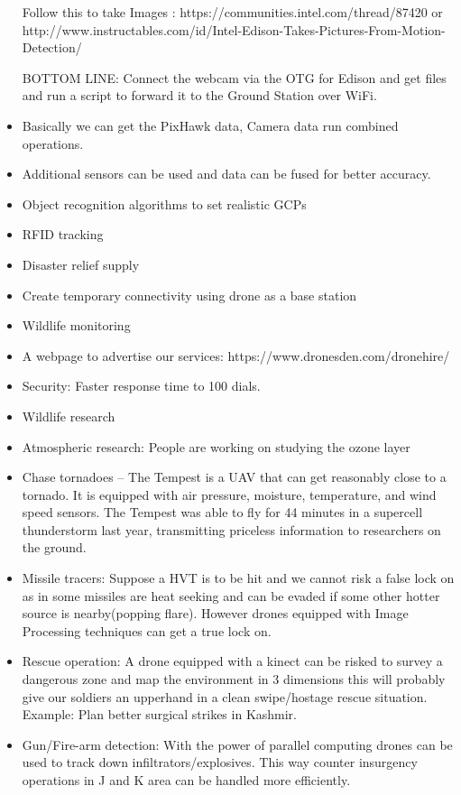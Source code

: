 \documentclass[12pt]{report}
\begin{document}
\begin{itemize}
Follow this to take Images : https://communities.intel.com/thread/87420 or http://www.instructables.com/id/Intel-Edison-Takes-Pictures-From-Motion-Detection/


BOTTOM LINE: Connect the webcam via the OTG for Edison and get files and run a script to forward it to the Ground Station over WiFi.


\item Basically we can get the PixHawk data, Camera data run combined operations.
\item Additional sensors can be used and data can be fused for better accuracy.
\item Object recognition algorithms to set realistic GCPs
\item RFID tracking
\item Disaster relief supply
\item Create temporary connectivity using drone as a base station
\item Wildlife monitoring
\item A webpage to advertise our services: https://www.dronesden.com/dronehire/
\item Security: Faster response time to 100 dials.
\item Wildlife research
\item Atmospheric research: People are working on studying the ozone layer
\item Chase tornadoes – The Tempest is a UAV that can get reasonably close to a tornado. It is equipped with air pressure, moisture, temperature, and wind speed sensors. The Tempest was able to fly for 44 minutes in a supercell thunderstorm last year, transmitting priceless information to researchers on the ground. 
\item Missile tracers: Suppose a HVT is to be hit and we cannot risk a false lock on as in  some missiles are heat seeking and can be evaded if some other hotter source is nearby(popping flare). However drones equipped with Image Processing techniques can get a true lock on.
\item Rescue operation: A drone equipped with a kinect can be risked to survey a dangerous zone and map the environment in 3 dimensions this will probably give our soldiers an upperhand in a clean swipe/hostage rescue situation. Example: Plan better surgical strikes in Kashmir.
\item Gun/Fire-arm detection: With the power of parallel computing drones can be used to track down infiltrators/explosives. This way counter insurgency operations in J and K area can be handled more efficiently.

\end{itemize}
\end{document}
